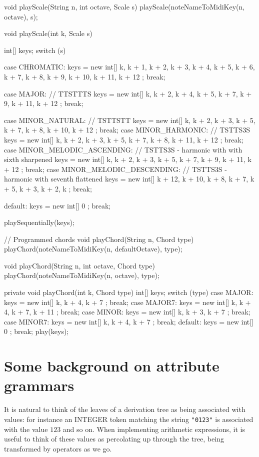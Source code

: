 \begin{codeblock}
{  void playScale(String n, int octave, Scale s) {
    playScale(noteNameToMidiKey(n, octave), s);
  }

  void playScale(int k, Scale s) {
    int[] keys;
    switch (s) {
    case CHROMATIC:
      keys = new int[] { k, k + 1, k + 2, k + 3, k + 4, k + 5, k + 6, 
     k + 7, k + 8, k + 9, k + 10, k + 11, k + 12 };
      break;

    case MAJOR: // TTSTTTS
      keys = new int[] { k, k + 2, k + 4, k + 5, k + 7, k + 9, k + 11, k + 12 };
      break;

    case MINOR_NATURAL: // TSTTSTT
      keys = new int[] { k, k + 2, k + 3, k + 5, k + 7, k + 8, k + 10, k + 12 };
      break;
    case MINOR_HARMONIC: // TSTTS3S
      keys = new int[] { k, k + 2, k + 3, k + 5, k + 7, k + 8, k + 11, k + 12 };
      break;
    case MINOR_MELODIC_ASCENDING: // TSTTS3S - harmonic with with sixth sharpened
      keys = new int[] { k, k + 2, k + 3, k + 5, k + 7, k + 9, k + 11, k + 12 };
      break;
    case MINOR_MELODIC_DESCENDING: // TSTTS3S - harmonic with seventh flattened 
      keys = new int[] { k + 12, k + 10, k + 8, k + 7, k + 5, k + 3, k + 2, k };
      break;

    default:
      keys = new int[] { 0 };
      break;
    }
    playSequentially(keys);
  }

  // Programmed chords
  void playChord(String n, Chord type) {
    playChord(noteNameToMidiKey(n, defaultOctave), type);
  }

  void playChord(String n, int octave, Chord type) {
    playChord(noteNameToMidiKey(n, octave), type);
  }

  private void playChord(int k, Chord type) {
    int[] keys;
    switch (type) {
    case MAJOR:
      keys = new int[] { k, k + 4, k + 7 };
      break;
    case MAJOR7:
      keys = new int[] { k, k + 4, k + 7, k + 11 };
      break;
    case MINOR:
      keys = new int[] { k, k + 3, k + 7 };
      break;
    case MINOR7:
      keys = new int[] { k, k + 4, k + 7 };
      break;
    default:
      keys = new int[] { 0 };
      break;
    }
    play(keys);
  }

}
\end{codeblock}
\appendix
\chapter{Some background on attribute grammars}
\label{attribute:grammars}

It is natural to think of the leaves of a derivation tree as being associated with values: for instance an INTEGER token matching the string \verb+"0123"+ is associated with the value $123$ and so on. When implementing arithmetic expressions, it is useful to think of these values as percolating up through the tree, being transformed by operators as we go.

